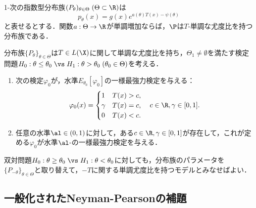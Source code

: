 \documentclass[uplatex,dvipdfmx]{jsreport}
\begin{document}
\begin{example}
    1-次の指数型分布族$(P_\theta)_{\theta\in\Theta}\;(\Theta\subset\R)$は
    \[p_\theta(x)=g(x)e^{a(\theta)T(x)-\psi(\theta)}\]
    と表せるとする．関数$a:\Theta\to\R$が単調増加ならば，$\P$は$T$-単調な尤度比を持つ分布族である．
\end{example}

\begin{theorem}[単調尤度比検定の特徴付け]
    分布族$\{P_\theta\}_{\theta\in\Theta}$は$T\in L(\X)$に関して単調な尤度比を持ち，$\Theta_1\ne\emptyset$を満たす検定問題$H_0:\theta\le\theta_0\;\vs\;H_1:\theta>\theta_0\;(\theta_0\in\Theta)$を考える．
    \begin{enumerate}
        \item 次の検定$\varphi_0$が，水準$E_{\theta_0}[\varphi_0]$の一様最強力検定を与える：
        \[\varphi_0(x)=\begin{cases}
            1&T(x)>c,\\
            \gamma&T(x)=c,\\
            0&T(x)<c.
        \end{cases}\quad c\in\R,\gamma\in[0,1].\]
        \item 任意の水準$\al\in(0,1)$に対して，ある$c\in\R,\gamma\in[0,1]$が存在して，これが定める$\varphi_0$が水準$\al$-の一様最強力検定を与える．
    \end{enumerate}
\end{theorem}
\begin{remarks}
    双対問題$H_0:\theta\ge\theta_0\;\vs\;H_1:\theta<\theta_0$に対しても，分布族のパラメータを$\{P_{-\theta}\}_{\theta\in\Theta}$と取り替えて，$-T$に関する単調尤度比を持つモデルとみなせばよい．
\end{remarks}

\subsection{一般化されたNeyman-Pearsonの補題}
\end{document}
